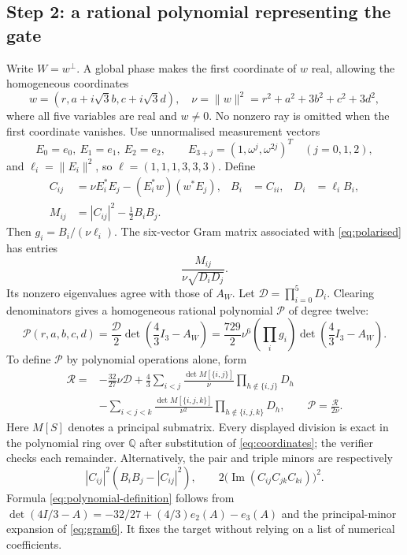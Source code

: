 \documentclass[11pt,a4paper]{article}
\numberwithin{equation}{section}
\theoremstyle{remark}\newtheorem{remark}[theorem]{Remark}
\begin{document}
\subsection{Step 2: a rational polynomial representing the gate}
Write $W=w^\perp$. A global phase makes the first coordinate of $w$ real, allowing the homogeneous coordinates
\begin{equation}
w=(r,a+i\sqrt3 b,c+i\sqrt3 d),\quad
\nu=\|w\|^2=r^2+a^2+3b^2+c^2+3d^2,
\label{eq:coordinates}
\end{equation}
where all five variables are real and $w\ne0$. No nonzero ray is omitted when the first coordinate vanishes. Use unnormalised measurement vectors
\[
E_0=e_0,\ E_1=e_1,\ E_2=e_2,\qquad
E_{3+j}=(1,\omega^j,\omega^{2j})^T\quad(j=0,1,2),
\]
and $\ell_i=\|E_i\|^2$, so $\ell=(1,1,1,3,3,3)$. Define
\begin{align}
C_{ij}&=\nu E_i^*E_j-(E_i^*w)(w^*E_j),&
B_i&=C_{ii},&D_i&=\ell_i B_i,\\
M_{ij}&=|C_{ij}|^2-\tfrac12 B_iB_j.
\end{align}
Then $g_i=B_i/(\nu\ell_i)$. The six-vector Gram matrix associated with \eqref{eq:polarised} has entries
\begin{equation}
\frac{M_{ij}}{\nu\sqrt{D_iD_j}}.
\label{eq:gram6}
\end{equation}
Its nonzero eigenvalues agree with those of $A_W$. Let $\mathcal D=\prod_{i=0}^5D_i$. Clearing denominators gives a homogeneous rational polynomial $\mathcal P$ of degree twelve:
\begin{equation}
\mathcal P(r,a,b,c,d)=\frac{\mathcal D}{2}
\det\left(\frac43I_3-A_W\right)
=\frac{729}{2}\nu^6\!\left(\prod_i g_i\right)
\det\left(\frac43I_3-A_W\right).
\label{eq:polynomial-normalisation}
\end{equation}
To define $\mathcal P$ by polynomial operations alone, form
\begin{align}
\mathcal R={}&-\frac{32}{27}\nu\mathcal D
+\frac43\sum_{i<j}\frac{\det M[\{i,j\}]}{\nu}
                   \prod_{h\notin\{i,j\}}D_h\nonumber\\
&-\sum_{i<j<k}\frac{\det M[\{i,j,k\}]}{\nu^2}
                   \prod_{h\notin\{i,j,k\}}D_h,
\qquad \mathcal P=\frac{\mathcal R}{2\nu}.
\label{eq:polynomial-definition}
\end{align}
Here $M[S]$ denotes a principal submatrix. Every displayed division is exact in the polynomial ring over $\mathbb Q$ after substitution of \eqref{eq:coordinates}; the verifier checks each remainder. Alternatively, the pair and triple minors are respectively
\[
|C_{ij}|^2(B_iB_j-|C_{ij}|^2),\qquad
2\bigl(\operatorname{Im}(C_{ij}C_{jk}C_{ki})\bigr)^2.
\]
Formula \eqref{eq:polynomial-definition} follows from $\det(4I/3-A)=-32/27+(4/3)e_2(A)-e_3(A)$ and the principal-minor expansion of \eqref{eq:gram6}. It fixes the target without relying on a list of numerical coefficients.
\end{document}
